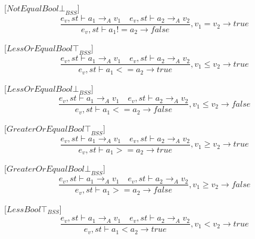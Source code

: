 [${NotEqualBool\bot}_{BSS}$]
\begin{equation}
	\frac { { e }_{ v },st\vdash { a }_{ 1 }{ \rightarrow  }_{ A }{ v }_{ 1 }\quad { e }_{ v },st\vdash { a }_{ 2 }{ \rightarrow  }_{ A }{ v }_{ 2 } }{ { e }_{ v },st\vdash { a }_{ 1 }!={ a }_{ 2 }{ \rightarrow  }false } ,{ v }_{ 1 }={ v }_{ 2 }\rightarrow true
\end{equation}

[${LessOrEqualBool\top}_{BSS}$]
\begin{equation}
	\frac { { e }_{ v },st\vdash { a }_{ 1 }{ \rightarrow  }_{ A }{ v }_{ 1 }\quad { e }_{ v },st\vdash { a }_{ 2 }{ \rightarrow  }_{ A }{ v }_{ 2 } }{ { e }_{ v },st\vdash { a }_{ 1 }<={ a }_{ 2 }{ \rightarrow  }true } ,{ v }_{ 1 }\le{ v }_{ 2 }\rightarrow true
\end{equation}

[${LessOrEqualBool\bot}_{BSS}$]
\begin{equation}
	\frac { { e }_{ v },st\vdash { a }_{ 1 }{ \rightarrow  }_{ A }{ v }_{ 1 }\quad { e }_{ v },st\vdash { a }_{ 2 }{ \rightarrow  }_{ A }{ v }_{ 2 } }{ { e }_{ v },st\vdash { a }_{ 1 }<={ a }_{ 2 }{ \rightarrow  }false } ,{ v }_{ 1 }\le{ v }_{ 2 }\rightarrow false
\end{equation}

[${GreaterOrEqualBool\top}_{BSS}$]
\begin{equation}
	\frac { { e }_{ v },st\vdash { a }_{ 1 }{ \rightarrow  }_{ A }{ v }_{ 1 }\quad { e }_{ v },st\vdash { a }_{ 2 }{ \rightarrow  }_{ A }{ v }_{ 2 } }{ { e }_{ v },st\vdash { a }_{ 1 }>={ a }_{ 2 }{ \rightarrow  }true } ,{ v }_{ 1 }\ge{ v }_{ 2 }\rightarrow true
\end{equation}

[${GreaterOrEqualBool\bot}_{BSS}$]
\begin{equation}
	\frac { { e }_{ v },st\vdash { a }_{ 1 }{ \rightarrow  }_{ A }{ v }_{ 1 }\quad { e }_{ v },st\vdash { a }_{ 2 }{ \rightarrow  }_{ A }{ v }_{ 2 } }{ { e }_{ v },st\vdash { a }_{ 1 }>={ a }_{ 2 }{ \rightarrow  }false } ,{ v }_{ 1 }\ge{ v }_{ 2 }\rightarrow false
\end{equation}

[${LessBool\top}_{BSS}$]
\begin{equation}
	\frac { { e }_{ v },st\vdash { a }_{ 1 }{ \rightarrow  }_{ A }{ v }_{ 1 }\quad { e }_{ v },st\vdash { a }_{ 2 }{ \rightarrow  }_{ A }{ v }_{ 2 } }{ { e }_{ v },st\vdash { a }_{ 1 }<{ a }_{ 2 }{ \rightarrow  }true } ,{ v }_{ 1 }<{ v }_{ 2 }\rightarrow true
\end{equation}

